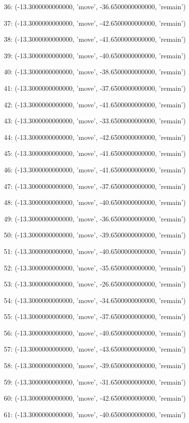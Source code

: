 36: (-13.3000000000000, 'move', -36.6500000000000, 'remain')


37: (-13.3000000000000, 'move', -42.6500000000000, 'remain')


38: (-13.3000000000000, 'move', -41.6500000000000, 'remain')


39: (-13.3000000000000, 'move', -40.6500000000000, 'remain')


40: (-13.3000000000000, 'move', -38.6500000000000, 'remain')


41: (-13.3000000000000, 'move', -37.6500000000000, 'remain')


42: (-13.3000000000000, 'move', -41.6500000000000, 'remain')


43: (-13.3000000000000, 'move', -33.6500000000000, 'remain')


44: (-13.3000000000000, 'move', -42.6500000000000, 'remain')


45: (-13.3000000000000, 'move', -41.6500000000000, 'remain')


46: (-13.3000000000000, 'move', -41.6500000000000, 'remain')


47: (-13.3000000000000, 'move', -37.6500000000000, 'remain')


48: (-13.3000000000000, 'move', -40.6500000000000, 'remain')


49: (-13.3000000000000, 'move', -36.6500000000000, 'remain')


50: (-13.3000000000000, 'move', -39.6500000000000, 'remain')


51: (-13.3000000000000, 'move', -40.6500000000000, 'remain')


52: (-13.3000000000000, 'move', -35.6500000000000, 'remain')


53: (-13.3000000000000, 'move', -26.6500000000000, 'remain')


54: (-13.3000000000000, 'move', -34.6500000000000, 'remain')


55: (-13.3000000000000, 'move', -37.6500000000000, 'remain')


56: (-13.3000000000000, 'move', -40.6500000000000, 'remain')


57: (-13.3000000000000, 'move', -43.6500000000000, 'remain')


58: (-13.3000000000000, 'move', -39.6500000000000, 'remain')


59: (-13.3000000000000, 'move', -31.6500000000000, 'remain')


60: (-13.3000000000000, 'move', -42.6500000000000, 'remain')


61: (-13.3000000000000, 'move', -40.6500000000000, 'remain')


